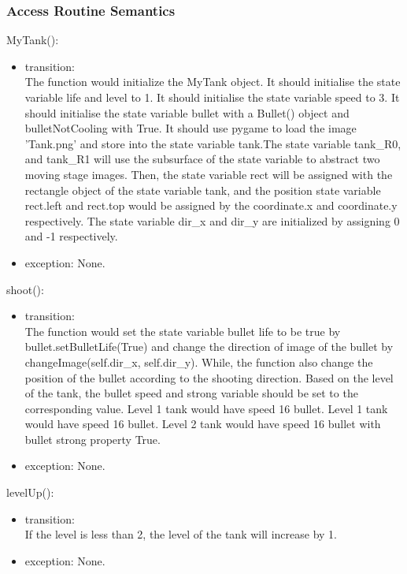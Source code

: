 \documentclass[12pt, titlepage]{article}
\begin{document}
		\subsubsection{Access Routine Semantics}
        MyTank():
		\begin{itemize}
		\item transition: \\
		The function would initialize the MyTank object. It should initialise the state variable life and level to 1. It should initialise the state variable speed to 3. It should initialise the state variable bullet with a Bullet() object and bulletNotCooling with True. It should use pygame to load the image 'Tank.png' and store into the state variable tank.The state variable tank\_R0, and tank\_R1 will use the subsurface of the state variable to abstract two moving stage images. Then, the state variable rect will be assigned with the rectangle object of the state variable tank, and the position state variable rect.left and rect.top would be assigned by the coordinate.x and coordinate.y respectively. The state variable dir\_x and dir\_y are initialized by assigning 0 and -1 respectively. 
		
		\item exception: None.
        \end{itemize}
        shoot():
		\begin{itemize}
		\item transition: \\
		The function would set the state variable bullet life to be true by bullet.setBulletLife(True) and change the direction of image of the bullet by changeImage(self.dir\_x, self.dir\_y). While, the function also change the position of the bullet according to the shooting direction. Based on the level of the tank, the bullet speed and strong variable should be set to the corresponding value. Level 1 tank would have speed 16 bullet. Level 1 tank would have speed 16 bullet. Level 2 tank would have speed 16 bullet with bullet strong property True.
		
		\item exception: None.
        \end{itemize}
        
        levelUp():
		\begin{itemize}
		\item transition: \\
		If the level is less than 2, the level of the tank will increase by 1.
		
		\item exception: None.
        \end{itemize}
        
\end{document}
